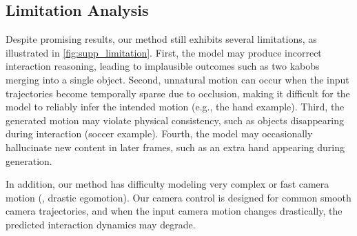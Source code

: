 \subsection{Limitation Analysis}
\label{sec:supp_limitation}

Despite promising results, our method still exhibits several limitations, as illustrated in \cref{fig:supp_limitation}. First, the model may produce incorrect interaction reasoning, leading to implausible outcomes such as two kabobs merging into a single object. Second, unnatural motion can occur when the input trajectories become temporally sparse due to occlusion, making it difficult for the model to reliably infer the intended motion (e.g., the hand example). Third, the generated motion may violate physical consistency, such as objects disappearing during interaction (soccer example). Fourth, the model may occasionally hallucinate new content in later frames, such as an extra hand appearing during generation.

In addition, our method has difficulty modeling very complex or fast camera motion (\eg, drastic egomotion). Our camera control is designed for common smooth camera trajectories, and when the input camera motion changes drastically, the predicted interaction dynamics may degrade.
